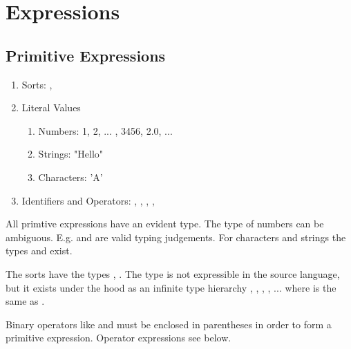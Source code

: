 \section{Expressions}



\subsection{Primitive Expressions}

\begin{enumerate}

\item Sorts: , 

\item Literal Values

    \begin{enumerate}

    \item Numbers: 1, 2, ... , 3456, 2.0, ...

    \item Strings: "Hello"

    \item Characters: 'A'

    \end{enumerate}

\item Identifiers and Operators:
    , \code{(+)}, \code{(,)} \code{[]},
    , 

\end{enumerate}


All primtive expressions have an evident type. The type of numbers can be
ambiguous. E.g.  and  are valid typing judgements. For
characters and strings the types  and  exist.


The sorts have the types , . The type
 is not expressible in the source language, but it exists under the
hood as an infinite type hierarchy , , ,
, ... where  is the same as .

Binary operators like \code{+} and \code{-} must be enclosed in parentheses in
order to form a primitive expression. Operator expressions see below.








